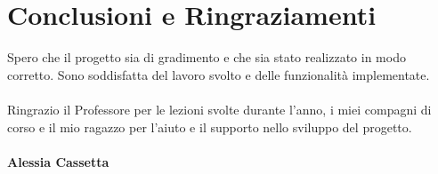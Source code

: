 \documentclass[12pt]{article}
\begin{document}
\section{Conclusioni e Ringraziamenti}
Spero che il progetto sia di gradimento e che sia stato realizzato in modo corretto. Sono soddisfatta del lavoro svolto e delle funzionalità implementate. \\ \\
Ringrazio il Professore per le lezioni svolte durante l'anno, i miei compagni di corso e il mio ragazzo per l'aiuto e il supporto nello sviluppo del progetto. \\ \\
\textbf{Alessia Cassetta}
\end{document}

